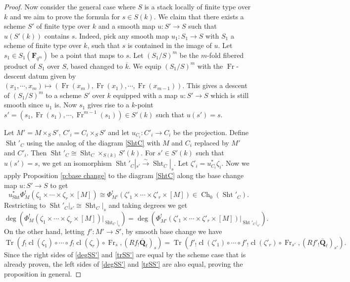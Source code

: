 \documentclass[reqno]{amsart}
\numberwithin{equation}{section}
\newcommand{\F}{\mathbf{F}}
\newcommand{\Q}{\mathbf{Q}}
\newcommand{\ol}[1]{\overline{#1}}
\DeclareMathOperator{\Frob}{Fr}
\DeclareMathOperator{\Tr}{Tr}
\DeclareMathOperator{\Sht}{Sht}
\DeclareMathOperator{\cla}{cl}
\DeclareMathOperator{\Ch}{Ch}
\newcommand{\isom}{\stackrel{\sim}{\to}}
\newcommand{\Qlbar}{\overline{\Q}_\ell}
\renewcommand\c{\circ}
\newcommand{\z}{\zeta}
\theoremstyle{remark}
\numberwithin{equation}{section}
\begin{document}
\begin{proof}
Now consider the general case where $S$ is a stack locally of finite type over $k$ and we aim to prove the formula for $s\in S(k)$. We claim that there exists a scheme $S'$ of finite type over $k$ and a smooth map $u: S'\to S$ such that $u(S'(k))$ contains $s$.  Indeed, pick any smooth map $u_{1}: S_{1}\to S$ with $S_{1}$ a scheme of finite type over $k$, such that  $s$ is contained in the image of $u$. Let $s_{1}\in S_{1}(\F_{q^{m}})$ be a point that maps to $s$. Let $(S_{1}/S)^{m}$ be the $m$-fold fibered product of $S_1$ over $S$, based changed to $\ol{k}$. We equip  $(S_{1}/S)^{m}$ with the $\Frob$-descent datum given by $(x_{1},\cdots, x_{m})\mapsto (\Frob(x_{m}), \Frob(x_{1}),\cdots, \Frob(x_{m-1}))$. This gives a descent of $(S_{1}/S)^{m}$ to a scheme $S'$ over $k$ equipped with a map $u:S'\to S$ which is still smooth since $u_{1}$ is. Now $s_{1}$ gives rise to a $k$-point $s'=(s_{1},\Frob(s_{1}),\cdots, \Frob^{m-1}(s_{1}))\in S'(k)$ such that $u(s')=s$. 

Let $M'=M\times_{S}S'$, $C'_{i}=C_{i}\times_{S}S'$ and let $u_{C_{i}}:C'_{i}\to C_{i}$ be the projection. Define $\Sht'_{C}$ using the analog of the diagram \eqref{ShtC} with $M$ and $C_{i}$ replaced by $M'$ and $C'_{i}$. Then $\Sht'_{C}\cong \Sht_{C}\times_{S(k)}S'(k)$. For $s'\in S'(k)$ such that $u(s')=s$, we get an isomorphism $\Sht'_{C}|_{s'}\isom \Sht_{C}|_{s}$. Let $\z'_{i}=u_{C_{i}}^{*}\z_{i}$. Now we apply Proposition \ref{p:base change} to the diagram \eqref{ShtC} along the base change map $u:S'\to S$ to get
\begin{equation}
u_{\Sht}^{*}\Phi_{M}^{!}(\z_{1}\times\cdots\times\z_{r} \times [M])\cong \Phi_{M'}^{!}(\z'_{1}\times\cdots\times\z'_{r} \times [M])\in \Ch_{0}(\Sht'_{C}).
\end{equation}
Restricting to $\Sht'_{C}|_{s'}\cong \Sht_{C}|_s$ and taking degrees we get
\begin{equation}\label{degSS'}
\deg(\Phi_{M}^{!}(\z_{1}\times\cdots\times\z_{r}  \times [M] )|_{\Sht_{C}|_s})=\deg(\Phi_{M'}^{!}(\z'_{1}\times\cdots\times\z'_{r}  \times [M])|_{\Sht'_{C}|_{s'}}).
\end{equation}
On the other hand, letting $f':M'\to S'$, by smooth base change we have
\begin{equation}\label{trSS'}
\Tr(f_{!}\cla(\z_{1})\c\cdots\c f_{!}\cla(\z_{r})\c\Frob_{s}, (Rf_{!}\Qlbar)_{s}) = \Tr(f'_{!}\cla(\z'_{1})\c\cdots\c f'_{!}\cla(\z'_{r})\c\Frob_{s'}, (Rf'_{!}\Qlbar)_{s'}).
\end{equation}
Since the right sides of \eqref{degSS'} and \eqref{trSS'} are equal by the scheme case that is already proven, the left sides of \eqref{degSS'} and \eqref{trSS'} are also equal, proving the proposition in general.
\end{proof}
\end{document}
